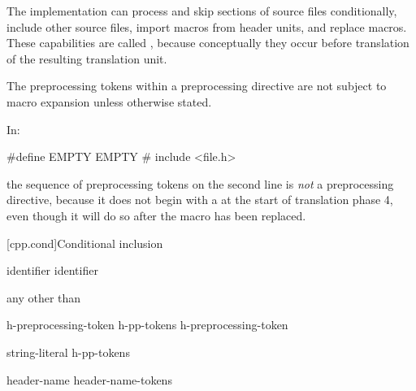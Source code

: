 \pnum
The implementation can
process and skip sections of source files conditionally,
include other source files,
import macros from header units,
and replace macros.
These capabilities are called
,
because conceptually they occur
before translation of the resulting translation unit.

\pnum
The preprocessing tokens within a preprocessing directive
are not subject to macro expansion unless otherwise stated.

\begin{example}
In:
\begin{codeblock}
#define EMPTY
EMPTY   #   include <file.h>
\end{codeblock}
the sequence of preprocessing tokens on the second line is \textit{not}
a preprocessing directive, because it does not begin with a \tcode{\#} at the start of
translation phase 4, even though it will do so after the macro 
has been replaced.
\end{example}

[cpp.cond]{Conditional inclusion}%
%

\begin{bnf}
\br
     identifier\br
     identifier \terminal{)}
\end{bnf}

\begin{bnf}
\br
    \textnormal{any  other than \terminal{>}}
\end{bnf}

\begin{bnf}
\br
    h-preprocessing-token\br
    h-pp-tokens h-preprocessing-token
\end{bnf}

\begin{bnf}
\br
    string-literal\br
    \terminal{<} h-pp-tokens \terminal{>}
\end{bnf}

%
\begin{bnf}
\br
     \terminal{(} header-name \terminal{)}\br
     \terminal{(} header-name-tokens \terminal{)}
\end{bnf}

